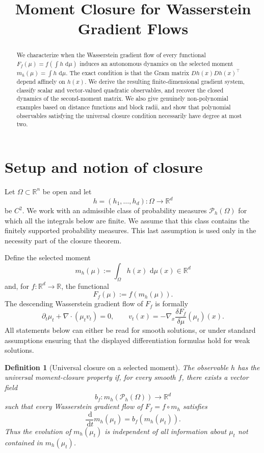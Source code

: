 \documentclass[11pt]{article}
\title{Moment Closure for Wasserstein Gradient Flows}
\author{}
\date{}
\newcommand{\R}{\mathbb R}
\newcommand{\dd}{\,\mathrm d}
\newcommand{\cP}{\mathcal P}
\newtheorem{definition}{Definition}
\theoremstyle{remark}
\begin{document}
\maketitle

\begin{abstract}
We characterize when the Wasserstein gradient flow of every functional
\(
F_f(\mu)=f(\int h\,\dd\mu)
\)
induces an autonomous dynamics on the selected moment
\(
m_h(\mu)=\int h\,\dd\mu.
\)
The exact condition is that the Gram matrix
\(
Dh(x)Dh(x)^\top
\)
depend affinely on \(h(x)\).  We derive the resulting finite-dimensional
gradient system, classify scalar and vector-valued quadratic observables,
and recover the closed dynamics of the second-moment matrix.  We also give
genuinely non-polynomial examples based on distance functions and block
radii, and show that polynomial observables satisfying the universal
closure condition necessarily have degree at most two.
\end{abstract}

\section{Setup and notion of closure}

Let \(\Omega\subset\R^n\) be open and let
\[
  h=(h_1,\ldots,h_d):\Omega\longrightarrow\R^d
\]
be \(C^2\).  We work with an admissible class of probability measures
\(\cP_h(\Omega)\) for which all the integrals below are finite.  We assume
that this class contains the finitely supported probability measures.  This
last assumption is used only in the necessity part of the closure theorem.

Define the selected moment
\[
  m_h(\mu):=\int_\Omega h(x)\,\dd\mu(x)\in\R^d
\]
and, for \(f:\R^d\to\R\), the functional
\[
  F_f(\mu):=f(m_h(\mu)).
\]
The descending Wasserstein gradient flow of \(F_f\) is formally
\[
  \partial_t\mu_t+\nabla\cdot(\mu_t v_t)=0,
  \qquad
  v_t(x)
  =
  -\nabla_x\frac{\delta F_f}{\delta\mu}(\mu_t)(x).
\]
All statements below can either be read for smooth solutions, or under
standard assumptions ensuring that the displayed differentiation formulas
hold for weak solutions.

\begin{definition}[Universal closure on a selected moment]
The observable \(h\) has the \emph{universal moment-closure property} if,
for every smooth \(f\), there exists a vector field
\[
  b_f:m_h(\cP_h(\Omega))\longrightarrow\R^d
\]
such that every Wasserstein gradient flow of \(F_f=f\circ m_h\) satisfies
\[
  \frac{\dd}{\dd t}m_h(\mu_t)=b_f(m_h(\mu_t)).
\]
Thus the evolution of \(m_h(\mu_t)\) is independent of all information about
\(\mu_t\) not contained in \(m_h(\mu_t)\).
\end{definition}
\end{document}
